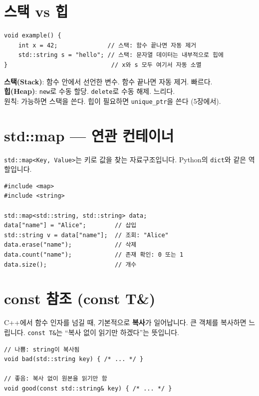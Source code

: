 \documentclass[11pt,a4paper]{book}
\newcommand{\code}[1]{\texttt{#1}}
\begin{document}
\section{스택 vs 힙}

\begin{lstlisting}[style=cpp]
void example() {
    int x = 42;              // 스택: 함수 끝나면 자동 제거
    std::string s = "hello"; // 스택: 문자열 데이터는 내부적으로 힙에
}                             // x와 s 모두 여기서 자동 소멸
\end{lstlisting}

\begin{conceptbox}[title={스택 vs 힙}]
\textbf{스택(Stack)}: 함수 안에서 선언한 변수. 함수 끝나면 자동 제거. 빠르다.\\
\textbf{힙(Heap)}: \code{new}로 수동 할당. \code{delete}로 수동 해제. 느리다.\\[6pt]
원칙: 가능하면 스택을 쓴다. 힙이 필요하면 \code{unique\_ptr}을 쓴다 (5장에서).
\end{conceptbox}

\section{std::map — 연관 컨테이너}

\code{std::map<Key, Value>}는 키로 값을 찾는 자료구조입니다. Python의 \code{dict}와 같은 역할입니다.

\begin{lstlisting}[style=cpp]
#include <map>
#include <string>

std::map<std::string, std::string> data;
data["name"] = "Alice";        // 삽입
std::string v = data["name"];  // 조회: "Alice"
data.erase("name");            // 삭제
data.count("name");            // 존재 확인: 0 또는 1
data.size();                   // 개수
\end{lstlisting}

\section{const 참조 (const T\&)}

C++에서 함수 인자를 넘길 때, 기본적으로 \textbf{복사}가 일어납니다. 큰 객체를 복사하면 느립니다. \code{const T\&}는 ``복사 없이 읽기만 하겠다''는 뜻입니다.

\begin{lstlisting}[style=cpp]
// 나쁨: string이 복사됨
void bad(std::string key) { /* ... */ }

// 좋음: 복사 없이 원본을 읽기만 함
void good(const std::string& key) { /* ... */ }
\end{lstlisting}
\end{document}
